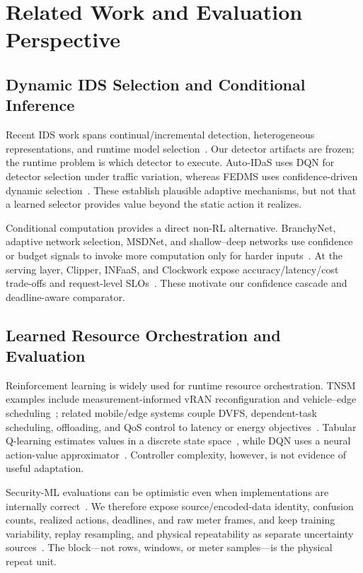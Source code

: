 \section{Related Work and Evaluation Perspective}
\subsection{Dynamic IDS Selection and Conditional Inference}
Recent IDS work spans continual/incremental detection, heterogeneous representations, and runtime model selection~\cite{Wang2024BFSNID,AOCIDS2024,StatAvg2025,DMIDS2025}. Our detector artifacts are frozen; the runtime problem is which detector to execute. Auto-IDaS uses DQN for detector selection under traffic variation, whereas FEDMS uses confidence-driven dynamic selection~\cite{Lin2024AutoIDaS,Hasan2026FEDMS}. These establish plausible adaptive mechanisms, but not that a learned selector provides value beyond the static action it realizes.

Conditional computation provides a direct non-RL alternative. BranchyNet, adaptive network selection, MSDNet, and shallow--deep networks use confidence or budget signals to invoke more computation only for harder inputs~\cite{Teerapittayanon2016BranchyNet,Bolukbasi2017Adaptive,Huang2018MSDNet,Kaya2019ShallowDeep}. At the serving layer, Clipper, INFaaS, and Clockwork expose accuracy/latency/cost trade-offs and request-level SLOs~\cite{Crankshaw2017Clipper,Romero2021INFaaS,Gujarati2020Clockwork}. These motivate our confidence cascade and deadline-aware comparator.

\subsection{Learned Resource Orchestration and Evaluation}
Reinforcement learning is widely used for runtime resource orchestration. TNSM examples include measurement-informed vRAN reconfiguration and vehicle--edge scheduling~\cite{Murti2024vRAN,Zhang2024VehicleEdge}; related mobile/edge systems couple DVFS, dependent-task scheduling, offloading, and QoS control to latency or energy objectives~\cite{Zhang2024DVFO,Lou2024Startup,Kim2024DistributedOffload,Maleki2024QCS,Nan2026RobustDNN,Wang2025TrustOffload,Hu2025SITOff,Zhang2024AoI,Luo2025SolarEdge}. Tabular Q-learning estimates values in a discrete state space~\cite{Watkins1992}, while DQN uses a neural action-value approximator~\cite{Mnih2015}. Controller complexity, however, is not evidence of useful adaptation.

Security-ML evaluations can be optimistic even when implementations are internally correct~\cite{Arp2022}. We therefore expose source/encoded-data identity, confusion counts, realized actions, deadlines, and raw meter frames, and keep training variability, replay resampling, and physical repeatability as separate uncertainty sources~\cite{Agarwal2021}. The block---not rows, windows, or meter samples---is the physical repeat unit.
